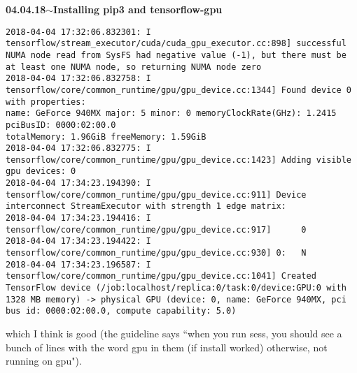 \documentclass[11pt,a4paper]{article}
\newenvironment{loggentry}[2]%
{\noindent\textbf{#1}\hspace{1cm}$\mathbf{\sim}$\text{ }\textbf{#2}\\}{\vspace{0.5cm}}
\begin{document}
\begin{loggentry}{04.04.18}{Installing pip3 and tensorflow-gpu}
\begin{verbatim}
2018-04-04 17:32:06.832301: I tensorflow/stream_executor/cuda/cuda_gpu_executor.cc:898] successful NUMA node read from SysFS had negative value (-1), but there must be at least one NUMA node, so returning NUMA node zero
2018-04-04 17:32:06.832758: I tensorflow/core/common_runtime/gpu/gpu_device.cc:1344] Found device 0 with properties: 
name: GeForce 940MX major: 5 minor: 0 memoryClockRate(GHz): 1.2415
pciBusID: 0000:02:00.0
totalMemory: 1.96GiB freeMemory: 1.59GiB
2018-04-04 17:32:06.832775: I tensorflow/core/common_runtime/gpu/gpu_device.cc:1423] Adding visible gpu devices: 0
2018-04-04 17:34:23.194390: I tensorflow/core/common_runtime/gpu/gpu_device.cc:911] Device interconnect StreamExecutor with strength 1 edge matrix:
2018-04-04 17:34:23.194416: I tensorflow/core/common_runtime/gpu/gpu_device.cc:917]      0 
2018-04-04 17:34:23.194422: I tensorflow/core/common_runtime/gpu/gpu_device.cc:930] 0:   N 
2018-04-04 17:34:23.196587: I tensorflow/core/common_runtime/gpu/gpu_device.cc:1041] Created TensorFlow device (/job:localhost/replica:0/task:0/device:GPU:0 with 1328 MB memory) -> physical GPU (device: 0, name: GeForce 940MX, pci bus id: 0000:02:00.0, compute capability: 5.0)
\end{verbatim}
which I think is good (the guideline says ``when you run sess, you should see a bunch of lines with the word gpu in them (if install worked) otherwise, not running on gpu").
\end{loggentry}
\end{document}
